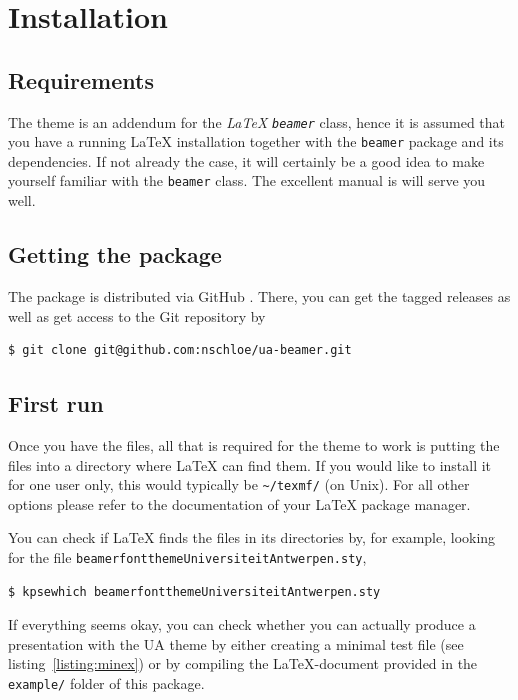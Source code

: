 \section{Installation}

\subsection{Requirements}
The theme is an addendum for the \emph{\LaTeX} \emph{\texttt{beamer}} class,
hence it is assumed that you have a running \LaTeX{} installation together with
the \texttt{beamer} package \cite{Miletic:2010:LBC} and its dependencies. If
not already the case, it will certainly be a good idea to make yourself
familiar with the \texttt{beamer} class. The excellent manual
\cite{TWM:2010:BCU} is will serve you well.

\subsection{Getting the package}

The package is distributed via GitHub \cite{GitHub:2011:uabeamer}. There, you
can get the tagged releases as well as get access to the Git repository by
\begin{lstlisting}
$ git clone git@github.com:nschloe/ua-beamer.git
\end{lstlisting}


\subsection{First run}
Once you have the files, all that is required for the theme to work is putting
the files into a directory where \LaTeX{} can find them. If you would like to
install it for one user only, this would typically be \lstinline{~/texmf/} (on
Unix). For all other options please refer to the documentation of your \LaTeX{}
package manager.

You can check if \LaTeX{} finds the files in its directories by, for example,
looking for the file \lstinline!beamerfontthemeUniversiteitAntwerpen.sty!,
\begin{lstlisting}
$ kpsewhich beamerfontthemeUniversiteitAntwerpen.sty
\end{lstlisting}

If everything seems okay, you can check whether you can actually produce a
presentation with the UA theme by either creating a minimal test file (see
listing~\ref{listing:minex}) or by compiling the \LaTeX-document provided in
the \lstinline!example/! folder of this package.


